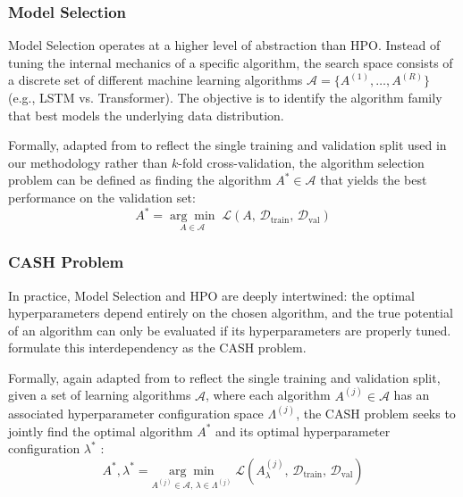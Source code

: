 \subsubsection{Model Selection}
Model Selection operates at a higher level of abstraction than \ac{HPO}. Instead of tuning the internal mechanics of a specific algorithm, the search space consists of a discrete set of different machine learning algorithms $\mathcal{A} = \{A^{(1)}, \dots, A^{(R)}\}$ (e.g., \ac{LSTM} vs. Transformer). The objective is to identify the algorithm family that best models the underlying data distribution. 


Formally, adapted from \textcite{AutoMLHoos} to reflect the single training and validation split used in our methodology rather than $k$-fold cross-validation, the algorithm selection problem can be defined as finding the algorithm $A^* \in \mathcal{A}$ that yields the best performance on the validation set:
\begin{equation}
    A^* = \underset{A \in \mathcal{A}}{\arg\min}\;
    \mathcal{L}\!\left(A,\, \mathcal{D}_\text{train},\,
    \mathcal{D}_\text{val}\right)
    \label{eq:model_selection}
\end{equation}

\subsubsection{CASH Problem}
In practice, Model Selection and \ac{HPO} are deeply intertwined: the optimal hyperparameters depend entirely on the chosen algorithm, and the true potential of an algorithm can only be evaluated if its hyperparameters are properly tuned. \textcite{hutter2019automated} formulate this interdependency as the \acf{CASH} problem.%

Formally, again adapted from \textcite{AutoMLHoos} to reflect the single training and validation split, given a set of learning algorithms $\mathcal{A}$, where each algorithm $A^{(j)} \in \mathcal{A}$ has an associated hyperparameter configuration space $\Lambda^{(j)}$, the \ac{CASH} problem seeks to jointly find the optimal algorithm $A^*$ and its optimal hyperparameter configuration $\lambda^*$ \parencite{AutoMLHoos}:
\begin{equation}
    A^*, \lambda^* = \underset{A^{(j)} \in \mathcal{A},\, \lambda \in \Lambda^{(j)}}{\arg\min}\;
    \mathcal{L}\!\left(A^{(j)}_\lambda,\, \mathcal{D}_\text{train},\,
    \mathcal{D}_\text{val}\right)
    \label{eq:cash}
\end{equation}

